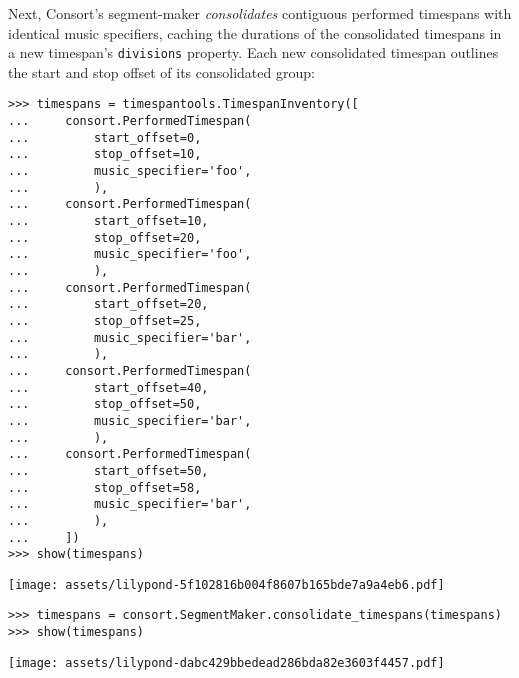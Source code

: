 Next, Consort's segment-maker \emph{consolidates} contiguous performed
timespans with identical music specifiers, caching the durations of the
consolidated timespans in a new timespan's \texttt{divisions} property. Each
new consolidated timespan outlines the start and stop offset of its
consolidated group:

\begin{comment}
<abjad>
timespans = timespantools.TimespanInventory([
    consort.PerformedTimespan(
        start_offset=0,
        stop_offset=10,
        music_specifier='foo',
        ),
    consort.PerformedTimespan(
        start_offset=10,
        stop_offset=20,
        music_specifier='foo',
        ),
    consort.PerformedTimespan(
        start_offset=20,
        stop_offset=25,
        music_specifier='bar',
        ),
    consort.PerformedTimespan(
        start_offset=40,
        stop_offset=50,
        music_specifier='bar',
        ),
    consort.PerformedTimespan(
        start_offset=50,
        stop_offset=58,
        music_specifier='bar',
        ),
    ])
show(timespans)
timespans = consort.SegmentMaker.consolidate_timespans(timespans)
show(timespans)
</abjad>
\end{comment}

\begin{abjadbookoutput}
\begin{singlespacing}
\vspace{-0.5\baselineskip}
\begin{lstlisting}
>>> timespans = timespantools.TimespanInventory([
...     consort.PerformedTimespan(
...         start_offset=0,
...         stop_offset=10,
...         music_specifier='foo',
...         ),
...     consort.PerformedTimespan(
...         start_offset=10,
...         stop_offset=20,
...         music_specifier='foo',
...         ),
...     consort.PerformedTimespan(
...         start_offset=20,
...         stop_offset=25,
...         music_specifier='bar',
...         ),
...     consort.PerformedTimespan(
...         start_offset=40,
...         stop_offset=50,
...         music_specifier='bar',
...         ),
...     consort.PerformedTimespan(
...         start_offset=50,
...         stop_offset=58,
...         music_specifier='bar',
...         ),
...     ])
>>> show(timespans)
\end{lstlisting}
\noindent\texttt{[image: assets/lilypond-5f102816b004f8607b165bde7a9a4eb6.pdf]}
\begin{lstlisting}
>>> timespans = consort.SegmentMaker.consolidate_timespans(timespans)
>>> show(timespans)
\end{lstlisting}
\noindent\texttt{[image: assets/lilypond-dabc429bbedead286bda82e3603f4457.pdf]}
\end{singlespacing}
\end{abjadbookoutput}


